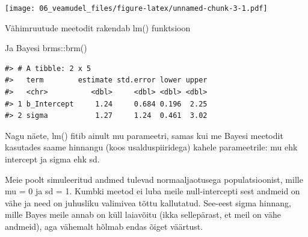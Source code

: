 \documentclass[]{book}
\newenvironment{Shaded}{\begin{snugshade}}{\end{snugshade}}
\newcommand{\CommentTok}[1]{\textcolor[rgb]{0.56,0.35,0.01}{\textit{#1}}}
\newcommand{\DataTypeTok}[1]{\textcolor[rgb]{0.13,0.29,0.53}{#1}}
\newcommand{\DecValTok}[1]{\textcolor[rgb]{0.00,0.00,0.81}{#1}}
\newcommand{\KeywordTok}[1]{\textcolor[rgb]{0.13,0.29,0.53}{\textbf{#1}}}
\newcommand{\NormalTok}[1]{#1}
\newcommand{\OperatorTok}[1]{\textcolor[rgb]{0.81,0.36,0.00}{\textbf{#1}}}
\newcommand{\StringTok}[1]{\textcolor[rgb]{0.31,0.60,0.02}{#1}}
\begin{document}
\texttt{[image: 06\_veamudel\_files/figure-latex/unnamed-chunk-3-1.pdf]}

\begin{Shaded}
\end{Shaded}

Vähimruutude meetodit rakendab lm() funktsioon

\begin{Shaded}
\end{Shaded}

Ja Bayesi brms::brm()

\begin{Shaded}
\end{Shaded}

\begin{verbatim}
#> # A tibble: 2 x 5
#>   term        estimate std.error lower upper
#>   <chr>          <dbl>     <dbl> <dbl> <dbl>
#> 1 b_Intercept     1.24     0.684 0.196  2.25
#> 2 sigma           1.27     1.24  0.461  3.02
\end{verbatim}

Nagu näete, lm() fitib ainult mu parameetri, samas kui me Bayesi meetodit kasutades saame hinnangu (koos usalduspiiridega) kahele parameetrile: mu ehk intercept ja sigma ehk sd.

Meie poolt simuleeritud andmed tulevad normaaljaotusega populatsioonist, mille mu = 0 ja sd = 1. Kumbki meetod ei luba meile null-intercepti sest andmeid on vähe ja need on juhusliku valimivea tõttu kallutatud. See-eest sigma hinnang, mille Bayes meile annab on küll laiavõitu (ikka sellepärast, et meil on vähe andmeid), aga vähemalt hõlmab endas õiget väärtust.
\end{document}
